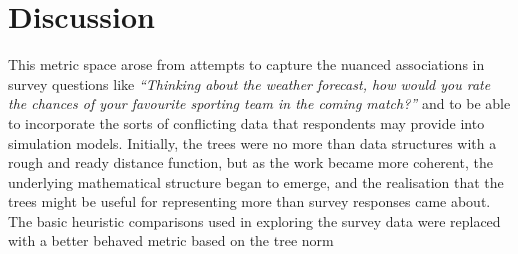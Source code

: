 
  

    
 



\section{Discussion}

This metric space arose from attempts to capture the nuanced
associations in survey questions like \textsl{``Thinking about the
  weather forecast, how would you rate the chances of your favourite
  sporting team in the coming match?''\/} and to be able to incorporate
the sorts of conflicting data that respondents may provide into
simulation models. Initially, the trees were no more than data
structures with a rough and ready distance function, but as the
work became more coherent, the underlying mathematical structure began
to emerge, and the realisation that the trees might be useful for
representing more than survey responses came about. The basic
heuristic comparisons used in exploring the survey data were replaced
with a better behaved metric based on the tree norm

